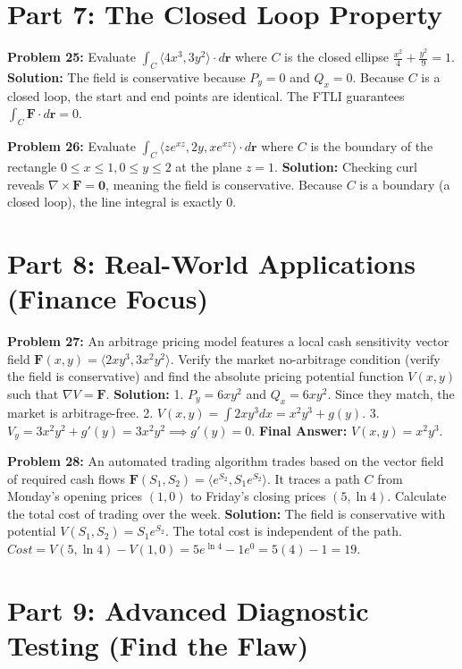 \documentclass[12pt]{article}
\begin{document}
\section*{Part 7: The Closed Loop Property}

\textbf{Problem 25:} Evaluate $\int_C \langle 4x^3, 3y^2 \rangle \cdot d\mathbf{r}$ where $C$ is the closed ellipse $\frac{x^2}{4} + \frac{y^2}{9} = 1$.
\textbf{Solution:} The field is conservative because $P_y = 0$ and $Q_x = 0$. Because $C$ is a closed loop, the start and end points are identical. The FTLI guarantees $\int_C \mathbf{F} \cdot d\mathbf{r} = 0$.

\textbf{Problem 26:} Evaluate $\int_C \langle z e^{xz}, 2y, x e^{xz} \rangle \cdot d\mathbf{r}$ where $C$ is the boundary of the rectangle $0 \le x \le 1, 0 \le y \le 2$ at the plane $z=1$.
\textbf{Solution:} Checking curl reveals $\nabla \times \mathbf{F} = \mathbf{0}$, meaning the field is conservative. Because $C$ is a boundary (a closed loop), the line integral is exactly $0$.

\section*{Part 8: Real-World Applications (Finance Focus)}

\textbf{Problem 27:} An arbitrage pricing model features a local cash sensitivity vector field $\mathbf{F}(x,y) = \langle 2xy^3, 3x^2y^2 \rangle$. Verify the market no-arbitrage condition (verify the field is conservative) and find the absolute pricing potential function $V(x,y)$ such that $\nabla V = \mathbf{F}$.
\textbf{Solution:} 
1. $P_y = 6xy^2$ and $Q_x = 6xy^2$. Since they match, the market is arbitrage-free.
2. $V(x,y) = \int 2xy^3 dx = x^2y^3 + g(y)$. 
3. $V_y = 3x^2y^2 + g'(y) = 3x^2y^2 \implies g'(y)=0$. 
\textbf{Final Answer:} $V(x,y) = x^2y^3$.

\textbf{Problem 28:} An automated trading algorithm trades based on the vector field of required cash flows $\mathbf{F}(S_1, S_2) = \langle e^{S_2}, S_1 e^{S_2} \rangle$. It traces a path $C$ from Monday's opening prices $(1, 0)$ to Friday's closing prices $(5, \ln 4)$. Calculate the total cost of trading over the week.
\textbf{Solution:} 
The field is conservative with potential $V(S_1, S_2) = S_1 e^{S_2}$. 
The total cost is independent of the path. 
$Cost = V(5, \ln 4) - V(1, 0) = 5e^{\ln 4} - 1e^0 = 5(4) - 1 = 19$.

\section*{Part 9: Advanced Diagnostic Testing (Find the Flaw)}
\end{document}
